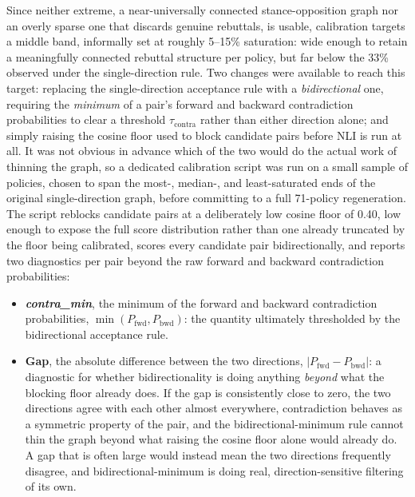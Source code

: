 Since neither extreme, a near-universally connected stance-opposition graph nor an overly sparse
one that discards genuine rebuttals, is usable, calibration targets a middle band, informally set
at roughly 5--15\% saturation: wide enough to retain a meaningfully connected rebuttal structure
per policy, but far below the 33\% observed under the single-direction rule. Two changes were
available to reach this target: replacing the single-direction acceptance rule with a
\emph{bidirectional} one, requiring the \emph{minimum} of a pair's forward and backward
contradiction probabilities to clear a threshold $\tau_{\text{contra}}$ rather than either
direction alone; and simply raising the cosine floor used to block candidate pairs before NLI is
run at all. It was not obvious in advance which of the two would do the actual work of thinning
the graph, so a dedicated calibration script was run on a small sample of policies, chosen to span
the most-, median-, and least-saturated ends of the original single-direction graph, before
committing to a full 71-policy regeneration. The script reblocks candidate pairs at a deliberately
low cosine floor of 0.40, low enough to expose the full score distribution rather than one already
truncated by the floor being calibrated, scores every candidate pair bidirectionally, and reports
two diagnostics per pair beyond the raw forward and backward contradiction probabilities:

\begin{itemize}
\item \textbf{\emph{contra\_min}}, the minimum of the forward and backward contradiction
probabilities, $\min(P_{\text{fwd}}, P_{\text{bwd}})$: the quantity ultimately thresholded by the
bidirectional acceptance rule.

\item \textbf{Gap}, the absolute difference between the two directions,
$|P_{\text{fwd}} - P_{\text{bwd}}|$: a diagnostic for whether bidirectionality is doing anything
\emph{beyond} what the blocking floor already does. If the gap is consistently close to zero, the
two directions agree with each other almost everywhere, contradiction behaves as a symmetric
property of the pair, and the bidirectional-minimum rule cannot thin the graph beyond what raising
the cosine floor alone would already do. A gap that is often large would instead mean the two
directions frequently disagree, and bidirectional-minimum is doing real, direction-sensitive
filtering of its own.
\end{itemize}

